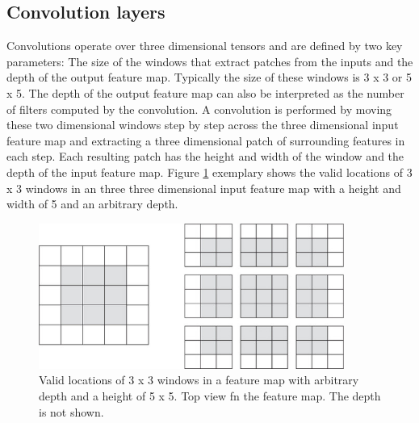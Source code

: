 \subsection{Convolution layers}
\label{convolution_layers}
Convolutions operate over three dimensional tensors and are defined by two key parameters: The size of the windows that extract patches from the inputs and the depth of the output feature map. Typically the size of these windows is 3 x 3 or 5 x 5. The depth of the output feature map can also be interpreted as the number of filters computed by the convolution. A convolution is performed by moving these two dimensional windows step by step across the three dimensional input feature map and extracting a three dimensional patch of surrounding features in each step. Each resulting patch has the height and width of the window and the depth of the input feature map. Figure \ref{fig:loc} exemplary shows the valid locations of 3 x 3 windows in an three three dimensional input feature map with a height and width of 5 and an arbitrary depth.



\begin{figure}[H]
	\centering
	\includegraphics[width=10cm]{images/nn/loc.jpg}
	\caption[Bild kurz]{Valid locations of 3 x 3 windows in a feature map with arbitrary depth and a height of 5 x 5. Top view fn the feature map. The depth is not shown.}
	\label{fig:loc}
\end{figure}


